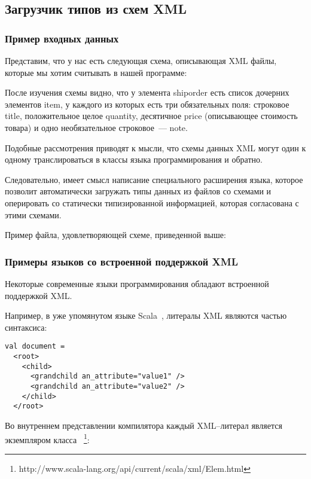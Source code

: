 \subsection{Загрузчик типов из схем XML}\label{xml-loader}

\subsubsection{Пример входных данных}

Представим, что у нас есть следующая схема, описывающая XML файлы, которые мы хотим считывать в нашей программе:


После изучения схемы видно, что у элемента shiporder есть список дочерних элементов item, у каждого из которых есть три обязательных поля: строковое title, положительное целое quantity, десятичное price (описывающее стоимость товара) и одно необязательное строковое~--- note.

Подобные рассмотрения приводят к мысли, что схемы данных XML могут один к одному транслироваться в классы языка программирования и обратно.

Следовательно, имеет смысл написание специального расширения языка, которое позволит автоматически загружать типы данных из файлов со схемами и оперировать со статически типизированной информацией, которая согласована с этими схемами.

Пример файла, удовлетворяющей схеме, приведенной выше:


\subsubsection{Примеры языков со встроенной поддержкой XML}
Некоторые современные языки программирования обладают встроенной поддержкой XML.

Например, в уже упомянутом языке Scala~\cite{scala-spec}, литералы XML являются частью синтаксиса:

\begin{lstlisting}[caption={Пример использования литералов XML в языке Scala.}, label=scala-xml-example]
val document =
  <root>
    <child>
      <grandchild an_attribute="value1" />
      <grandchild an_attribute="value2" />
    </child>
  </root>
\end{lstlisting}
Во внутреннем представлении компилятора каждый XML--литерал является экземпляром класса ~\footnote{http://www.scala-lang.org/api/current/scala/xml/Elem.html}:

